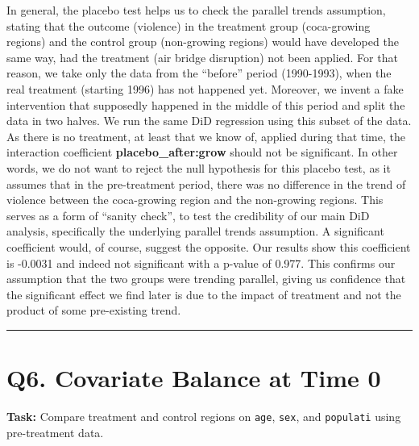 \documentclass[
]{article}
\begin{document}
In general, the placebo test helps us to check the parallel trends
assumption, stating that the outcome (violence) in the treatment group
(coca-growing regions) and the control group (non-growing regions) would
have developed the same way, had the treatment (air bridge disruption)
not been applied. For that reason, we take only the data from the
``before'' period (1990-1993), when the real treatment (starting 1996)
has not happened yet. Moreover, we invent a fake intervention that
supposedly happened in the middle of this period and split the data in
two halves. We run the same DiD regression using this subset of the
data. As there is no treatment, at least that we know of, applied during
that time, the interaction coefficient \textbf{placebo\_after:grow}
should not be significant. In other words, we do not want to reject the
null hypothesis for this placebo test, as it assumes that in the
pre-treatment period, there was no difference in the trend of violence
between the coca-growing region and the non-growing regions. This serves
as a form of ``sanity check'', to test the credibility of our main DiD
analysis, specifically the underlying parallel trends assumption. A
significant coefficient would, of course, suggest the opposite. Our
results show this coefficient is -0.0031 and indeed not significant with
a p-value of 0.977. This confirms our assumption that the two groups
were trending parallel, giving us confidence that the significant effect
we find later is due to the impact of treatment and not the product of
some pre-existing trend.

\begin{center}\rule{0.5\linewidth}{0.5pt}\end{center}

\section{Q6. Covariate Balance at Time
0}\label{q6.-covariate-balance-at-time-0}

\textbf{Task:} Compare treatment and control regions on \texttt{age},
\texttt{sex}, and \texttt{populati} using pre-treatment data.
\end{document}
